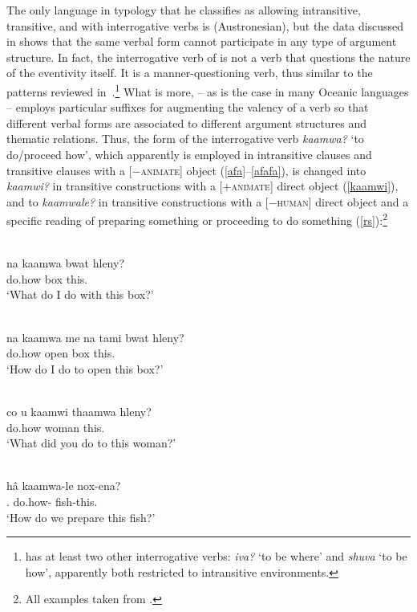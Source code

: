 \documentclass[output=paper]{langsci/langscibook}
\begin{document}
The only language in  typology that he classifies as
allowing intransitive, transitive, and  with
interrogative verbs is  (Austronesian), but the data discussed
in \citet{bril2002,bril2004} shows that the same verbal form cannot participate
in any type of argument structure. In fact, the interrogative verb of
 is not a verb that questions the nature of the eventivity
itself. It is a manner-questioning verb, thus similar to the patterns reviewed
in~.\footnote{ has at least two other
interrogative verbs: \emph{iva?} `to be where' and \emph{shuva} `to be how',
apparently both restricted to intransitive environments.} What is more,
 -- as is the case in many Oceanic languages -- employs
particular suffixes for augmenting the valency of a verb so that different
verbal forms are associated to different argument structures and thematic
relations. Thus, the form of the interrogative verb \emph{kaamwa?} `to
do/proceed how', which apparently is employed in intransitive clauses and
transitive clauses with a [−\textsc{animate}] object (\ref{afa}--\ref{afafa}), is
changed into \emph{kaamwi?} in transitive constructions with a [+\textsc{animate}]
direct object (\ref{kaamwi}), and to \emph{kaamwale?} in transitive
constructions with a [−\textsc{human}] direct object and a specific reading of preparing
something or proceeding to do something (\ref{rs}):\footnote{All examples
taken from \citet[50]{bril2002}.}

\begin{exe}
    \ex \label{afa} \\
\gll na kaamwa	bwat hleny? \\
\Fsg{} do.how box this.\Dei{}\\
\glt `What do I do with this box?'

\ex \label{afafa} \\
\gll na kaamwa	me	na tami bwat hleny?\\
\Fsg{} do.how \Depend{}	\Fsg{} open box this.\Dei{}\\
\glt `How do I do to open this box?'

\ex \label{kaamwi}\\
\gll    co u kaamwi thaamwa hleny?\\
            \Ssg{} \Acc{} do.how woman	this.\Dei{}\\
\glt `What did you do to this woman?'

\ex \label{rs}\\
\gll h\^{a}	kaamwa-le	nox-ena?\\
\Fpl.\Incl{} do.how-\Tr{} fish-this.\Dei{}\\
\glt `How do we prepare this fish?'
\end{exe}
\end{document}
